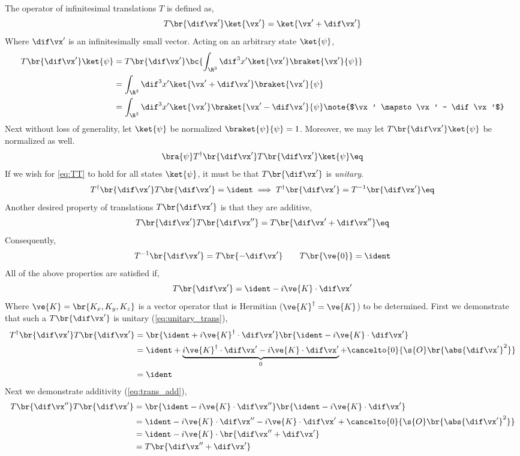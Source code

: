 \documentclass{article}
\begin{document}
The operator of infinitesimal translations $T$ is defined as,
\[ T\br{\dif \vx'}\ket{\vx'} = \ket{\vx' + \dif \vx'} \]
Where $\dif \vx'$ is an infinitesimally small vector. Acting on an arbitrary state $\ket{\psi}$,
\begin{align*}
T\br{\dif \vx'}\ket{\psi} &= T\br{\dif \vx'} \bc{\int_{\R^3} \dif^3 x' \ket{\vx'} \braket{\vx'}{\psi}} \\
&= \int_{\R^3} \dif^3 x' \ket{\vx' + \dif \vx'} \braket{\vx'}{\psi} \\
&= \int_{\R^3} \dif^3 x' \ket{\vx'} \braket{\vx' - \dif \vx'}{\psi} \note{$\vx' \mapsto \vx' - \dif \vx'$}\\
\end{align*}
Next without loss of generality, let $\ket{\psi}$ be normalized $\braket{\psi}{\psi} = 1$. Moreover, we may let $T\br{\dif \vx'}\ket{\psi}$ be normalized as well.
\[ \bra{\psi}T^{\dagger}\br{\dif \vx'} T\br{\dif \vx'}\ket{\psi} \eq \label{eq:TT}\]
If we wish for \cref{eq:TT} to hold for all states $\ket{\psi}$, it must be that $T\br{\dif \vx'}$ is \textit{unitary}.
\[ T^{\dagger}\br{\dif \vx'} T\br{\dif \vx'} = \ident \implies T^{\dagger}\br{\dif \vx'} = T^{-1}\br{\dif \vx'} \eq\label{eq:unitary_trans}\]
Another desired property of translations $T\br{\dif \vx'}$ is that they are additive,
\[ T\br{\dif \vx'}T\br{\dif \vx''} = T\br{\dif \vx' + \dif \vx''} \eq \label{eq:trans_add}\]
Consequently,
\[ T^{-1}\br{\dif \vx'} = T\br{-\dif \vx'} \qquad T\br{\ve{0}} = \ident \]
All of the above properties are satisfied if,
\[ T\br{\dif \vx'} = \ident - i \ve{K} \cdot \dif \vx' \]
Where $\ve{K} = \br{K_x, K_y, K_z}$ is a vector operator that is Hermitian ($\ve{K}^{\dagger} = \ve{K}$) to be determined. First we demonstrate that such a $T\br{\dif \vx'}$ is unitary (\cref{eq:unitary_trans}),
\begin{align*}
T^{\dagger}\br{\dif \vx'} T\br{\dif \vx'} &= \br{\ident + i \ve{K}^{\dagger} \cdot \dif \vx'}\br{\ident - i \ve{K} \cdot \dif \vx'} \\
&= \ident + \underbrace{i \ve{K}^{\dagger} \cdot \dif \vx' - i \ve{K} \cdot \dif \vx'}_{0} + \cancelto{0}{\s{O}\br{\abs{\dif \vx'}^2}} \\
&= \ident
\end{align*}
Next we demonstrate additivity (\cref{eq:trans_add}),
\begin{align*}
T\br{\dif \vx''} T\br{\dif \vx'} &= \br{\ident - i \ve{K} \cdot \dif \vx''}\br{\ident - i \ve{K} \cdot \dif \vx'} \\
&= \ident - i \ve{K} \cdot \dif \vx'' - i \ve{K} \cdot \dif \vx' + \cancelto{0}{\s{O}\br{\abs{\dif \vx'}^2}} \\
&= \ident - i \ve{K} \cdot \br{\dif \vx'' + \dif \vx'} \\
&= T\br{\dif \vx'' + \dif \vx'}
\end{align*}
\end{document}
